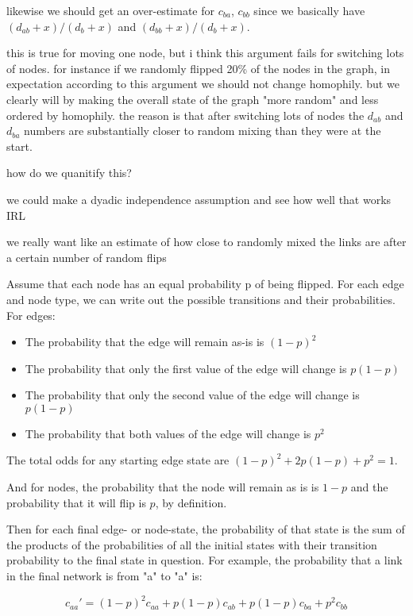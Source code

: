 \documentclass[a4paper]{article}
\begin{document}
likewise we should get an over-estimate for $c_{ba}$, $c_{bb}$ since we basically have $(d_{ab} + x) / (d_b + x)$ and $(d_{bb} + x) / (d_b + x)$.

this is true for moving one node, but i think this argument fails for switching lots of nodes. for instance if we randomly flipped 20\% of the nodes in the graph, in expectation according to this argument we should not change homophily. but we clearly will by making the overall state of the graph "more random" and less ordered by homophily. the reason is that after switching lots of nodes the $d_{ab}$ and $d_{ba}$ numbers are substantially closer to random mixing than they were at the start.

how do we quanitify this?

we could make a dyadic independence assumption and see how well that works IRL

we really want like an estimate of how close to randomly mixed the links are after a certain number of random flips

Assume that each node has an equal probability p of being flipped. For each edge and node type, we can write out the possible transitions and their probabilities. For edges:

\begin{itemize}
\item The probability that the edge will remain as-is is $(1-p)^2$
\item The probability that only the first value of the edge will change is $p(1-p)$
\item The probability that only the second value of the edge will change is $p(1-p)$
\item The probability that both values of the edge will change is $p^2$
\end{itemize}

The total odds for any starting edge state are $(1-p)^2 + 2p(1-p) + p^2 = 1$.

And for nodes, the probability that the node will remain as is is $1-p$ and the probability that it will flip is $p$, by definition.

Then for each final edge- or node-state, the probability of that state is the sum of the products of the probabilities of all the initial states with their transition probability to the final state in question. For example, the probability that a link in the final network is from "a" to "a" is:

\begin{equation*}
c_{aa}' = (1-p)^2c_{aa} + p(1-p)c_{ab} + p(1-p)c_{ba} + p^2c_{bb}
\end{equation*}
\end{document}

